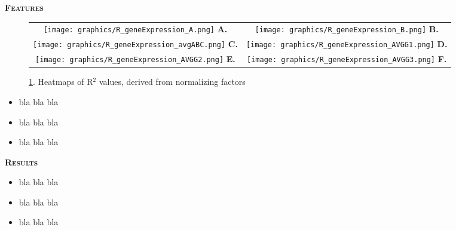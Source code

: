 \documentclass[final,t]{beamer}
\begin{document}
\begin{frame}{}
\begin{columns}
\begin{column}{.5\linewidth}
		\begin{block}{\textsc{\textbf{Features}}}
			\vspace*{3mm}
			\begin{figure}
				\begin{tabular}{cc}
					\hspace*{5mm}

					\texttt{[image: graphics/R\_geneExpression\_A.png]}
					\textbf{A.}
					&                     
					\texttt{[image: graphics/R\_geneExpression\_B.png]}
					\textbf{B.}\\

					\texttt{[image: graphics/R\_geneExpression\_avgABC.png]}
					\textbf{C.}
					&                      
					\texttt{[image: graphics/R\_geneExpression\_AVGG1.png]}
					\textbf{D.}\\

					\texttt{[image: graphics/R\_geneExpression\_AVGG2.png]}
					\textbf{E.}
					&                      
					\texttt{[image: graphics/R\_geneExpression\_AVGG3.png]}
					\textbf{F.}\\
				\end{tabular}				
				\caption{\ref{tab:ge}. Heatmaps of R$^{2}$ values, derived from normalizing factors}
				\label{tab:ge}
			\end{figure}
			\begin{itemize}
				\item  bla bla bla
				\item  bla bla bla
				\item  bla bla bla
			\end{itemize}
			\vspace*{3mm}
		\end{block}
		\begin{block}{\textsc{\textbf{Results}}}
			\vspace*{3mm}
			
			
			\begin{itemize}
				\item  bla bla bla
				\item  bla bla bla
				\item  bla bla bla				
			\end{itemize}
			\vspace*{3mm}
	\end{block}


\end{column}
\end{columns}
\end{frame}
\end{document}
